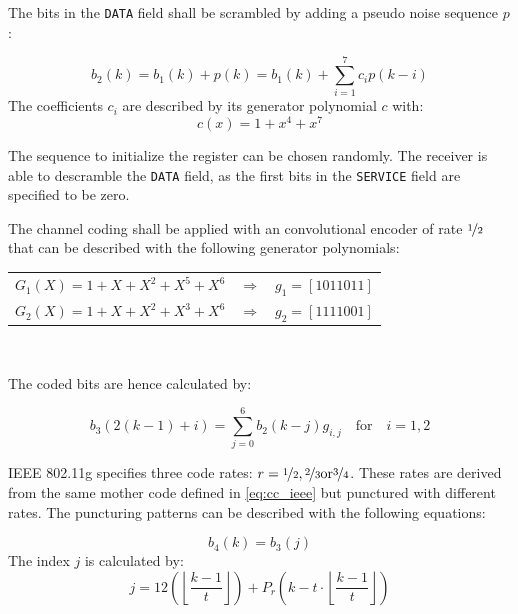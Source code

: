 The bits in the \texttt{DATA} field shall be scrambled by adding a pseudo noise sequence $p$:
 
\begin{equation}
b_2(k) = b_1(k) + p(k) = b_1(k) + \sum_{i=1}^{7}c_i p(k-i)
\label{pn_ieee}
\end{equation}
The coefficients $c_i$ are described by its generator polynomial $c$ with:
\begin{equation}
c(x) = 1+x^4+x^7
\end{equation}

The sequence to initialize the register can be chosen randomly. The receiver is able to descramble the \texttt{DATA} field, as the first bits in the \texttt{SERVICE} field are specified to be zero.

The channel coding shall be applied with an convolutional encoder of rate $\nicefrac{1}{2}$ that can be described with the following generator polynomials:

\begin{table}
	\centering\begin{tabular}{lcl}
		$G_1(X)=1+X+X^2+X^5+X^6$		&$\Rightarrow$	&$g_1=[1 0 1 1 0 1 1]$\\
		$G_2(X)=1+X+X^2+X^3+X^6$	&$\Rightarrow$	&$g_2=[1 1 1 1 0 0 1]$\\		
	\end{tabular}\\
\end{table}

The coded bits are hence calculated by:

\begin{equation}
 b_3(2(k-1)+i)=\sum_{j=0}^{6} b_2(k-j)g_{i,j} \quad \text{for} \quad  i=1,2
 \label{eq:cc_ieee}
\end{equation}

IEEE 802.11g specifies three code rates: $r = \nicefrac{1}{2},\nicefrac{2}{3}\text{or}\nicefrac{3}{4}$. These rates are derived from the same mother code defined in \ref{eq:cc_ieee} but punctured with different rates. The puncturing patterns can be described with the following equations:

\begin{equation}
b_4(k) = b_3(j)
\end{equation}
The index $j$ is calculated by: 
\begin{equation}
	j = 12\left(\left\lfloor \frac{k-1}{t}\right\rfloor \right)+ P_{r} \left( k - t \cdot \left\lfloor \frac{k-1}{t}\right\rfloor\right) 
\end{equation}


